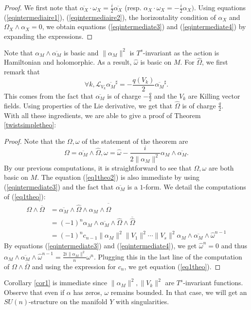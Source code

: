 \documentclass[12pt, reqno]{amsart}
\newcommand{\lied}{\mathcal{L}}
\begin{document}
 \begin{proof}
     We first note that $\overline{\alpha_X}\cdot\omega_X=\frac{i}{2}\overline{\alpha_X}$ (resp. $\alpha_X\cdot\omega_X=-\frac{i}{2 }\alpha_X)$. Using equations (\ref{eqintermediaire1}), (\ref{eqintermediaire2}), the horizontality condition of $\alpha_X$ and $\Omega_X\wedge\alpha_X=0$, we obtain equations (\ref{eqintermediate3}) and (\ref{eqintermediate4}) by expanding the expressions. 
 \end{proof}
 \indent Note that $\alpha_M\wedge\overline{\alpha_M}$ is basic and $\|\alpha_M\|^2$ is $T^s$-invariant as the action is Hamiltonian and holomorphic. As a result, $\hat\omega$ is basic on $M$. For $\hat\Omega$, we first remark that \[\forall k, \lied_{V_k}\overline{\alpha_M}^\sharp=-\frac{q(V_k)}{2}\overline{\alpha_M}^\sharp.\] This comes from the fact that $\overline{\alpha_M}$ is of charge $-\frac{q}{2}$ and the $V_k$ are Killing vector fields. Using properties of the Lie derivative, we get that $\hat\Omega$ is of charge $\frac{q}{2}$. \\ 
 \indent With all these ingredients, we are able to give a proof of Theorem \ref{twistsimpletheo}: 
 \begin{proof}
      Note that the $\Omega,\omega$ of the statement of the theorem are \[\Omega=\overline{\alpha_M}\wedge\hat\Omega,\omega=\hat\omega-\frac{i}{2\|\alpha_M\|^2}\alpha_M\wedge\overline{\alpha_M}.\] By our previous computations, it is straightforward to see that $\Omega,\omega$ are both basic on $M$. The equation (\ref{eq1theo2}) is also immediate by using (\ref{eqintermediate3}) and the fact that $\overline{\alpha_M}$ is a $1$-form. We detail the computations of (\ref{eq1theo}):
      \begin{align*}
          \Omega\wedge\overline{\Omega}&=\overline{\alpha_M}\wedge\hat\Omega\wedge\alpha_M\wedge\overline{\hat\Omega}\\
          &=(-1)^n\alpha_M\wedge\overline{\alpha_M}\wedge\hat\Omega\wedge\overline{\hat\Omega}\\
          &=(-1)^nc_{n-1}\|\alpha_M\|^2\|V_1\|^2\cdots\|V_s\|^2\alpha_M\wedge\overline{\alpha_M}\wedge\hat\omega^{n-1}
      \end{align*}
      By equations (\ref{eqintermediate3}) and (\ref{eqintermediate4}), we get $\hat\omega^n=0$ 
      and thus $\alpha_M\wedge\overline{\alpha_M}\wedge\hat\omega^{n-1}=\frac{2i\|\alpha_M\|^2}{n}\omega^n$. Plugging this in the last line of the computation of $\Omega\wedge\overline{\Omega}$ and using the expression for $c_n$, we get equation (\ref{eq1theo}).
 \end{proof}
  Corollary \ref{cor1} is immediate since $\|\alpha_M\|^2,\|V_k\|^2$ are $T^s$-invariant functions. Observe that even if $\alpha$ has zeros, $\omega$ remains bounded. In that case, we will get an $SU(n)$-structure on the manifold $Y$ with singularities.
\end{document}
